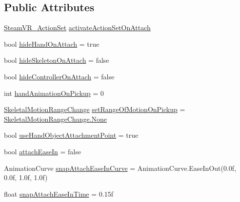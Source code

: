 \subsection*{Public Attributes}
\begin{DoxyCompactItemize}
\item 
\mbox{\hyperlink{class_valve_1_1_v_r_1_1_steam_v_r___action_set}{Steam\+V\+R\+\_\+\+Action\+Set}} \mbox{\hyperlink{class_valve_1_1_v_r_1_1_interaction_system_1_1_interactable_a3db5d422f3dcdd7ae3eb601d61f219dd}{activate\+Action\+Set\+On\+Attach}}
\item 
bool \mbox{\hyperlink{class_valve_1_1_v_r_1_1_interaction_system_1_1_interactable_a491fd1599c1f2e7e964d316d5522d9cb}{hide\+Hand\+On\+Attach}} = true
\item 
bool \mbox{\hyperlink{class_valve_1_1_v_r_1_1_interaction_system_1_1_interactable_ab363ae0e1f44fd0957e454d2759deba2}{hide\+Skeleton\+On\+Attach}} = false
\item 
bool \mbox{\hyperlink{class_valve_1_1_v_r_1_1_interaction_system_1_1_interactable_a40cc396011f2fabb28c0fd2882444598}{hide\+Controller\+On\+Attach}} = false
\item 
int \mbox{\hyperlink{class_valve_1_1_v_r_1_1_interaction_system_1_1_interactable_a8cb40c3f42b89256c1cf182825b7a95f}{hand\+Animation\+On\+Pickup}} = 0
\item 
\mbox{\hyperlink{namespace_valve_1_1_v_r_aabb506007a41244de5c315ff5519439f}{Skeletal\+Motion\+Range\+Change}} \mbox{\hyperlink{class_valve_1_1_v_r_1_1_interaction_system_1_1_interactable_a7d89faa46f0f9dcd8f182b210194d84d}{set\+Range\+Of\+Motion\+On\+Pickup}} = \mbox{\hyperlink{namespace_valve_1_1_v_r_aabb506007a41244de5c315ff5519439fa6adf97f83acf6453d4a6a4b1070f3754}{Skeletal\+Motion\+Range\+Change.\+None}}
\item 
bool \mbox{\hyperlink{class_valve_1_1_v_r_1_1_interaction_system_1_1_interactable_adab4955f68b0bee987e47238b4199623}{use\+Hand\+Object\+Attachment\+Point}} = true
\item 
bool \mbox{\hyperlink{class_valve_1_1_v_r_1_1_interaction_system_1_1_interactable_a96fc34b469a69d85a29588f2f5b13f2b}{attach\+Ease\+In}} = false
\item 
Animation\+Curve \mbox{\hyperlink{class_valve_1_1_v_r_1_1_interaction_system_1_1_interactable_a5a89126ac4ccf07d3f5ee2b1e7f4cfb7}{snap\+Attach\+Ease\+In\+Curve}} = Animation\+Curve.\+Ease\+In\+Out(0.\+0f, 0.\+0f, 1.\+0f, 1.\+0f)
\item 
float \mbox{\hyperlink{class_valve_1_1_v_r_1_1_interaction_system_1_1_interactable_a811959ba2752dab29cd5e8b0307fc6ff}{snap\+Attach\+Ease\+In\+Time}} = 0.\+15f

\end{DoxyCompactItemize}
